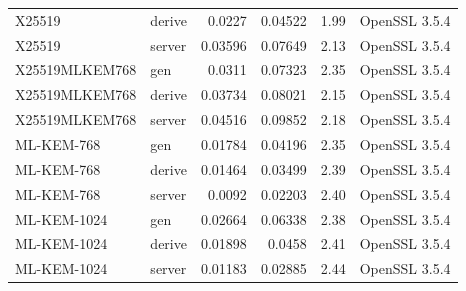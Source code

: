 \begin{tabular}{@{}llrrrl@{}}
X25519 & derive & 0.0227 & 0.04522 & 1.99 & OpenSSL 3.5.4 \\
X25519 & server & 0.03596 & 0.07649 & 2.13 & OpenSSL 3.5.4 \\
X25519MLKEM768 & gen & 0.0311 & 0.07323 & 2.35 & OpenSSL 3.5.4 \\
X25519MLKEM768 & derive & 0.03734 & 0.08021 & 2.15 & OpenSSL 3.5.4 \\
X25519MLKEM768 & server & 0.04516 & 0.09852 & 2.18 & OpenSSL 3.5.4 \\
ML-KEM-768 & gen & 0.01784 & 0.04196 & 2.35 & OpenSSL 3.5.4 \\
ML-KEM-768 & derive & 0.01464 & 0.03499 & 2.39 & OpenSSL 3.5.4 \\
ML-KEM-768 & server & 0.0092 & 0.02203 & 2.40 & OpenSSL 3.5.4 \\
ML-KEM-1024 & gen & 0.02664 & 0.06338 & 2.38 & OpenSSL 3.5.4 \\
ML-KEM-1024 & derive & 0.01898 & 0.0458 & 2.41 & OpenSSL 3.5.4 \\
ML-KEM-1024 & server & 0.01183 & 0.02885 & 2.44 & OpenSSL 3.5.4 \\
\bottomrule
\end{tabular}
